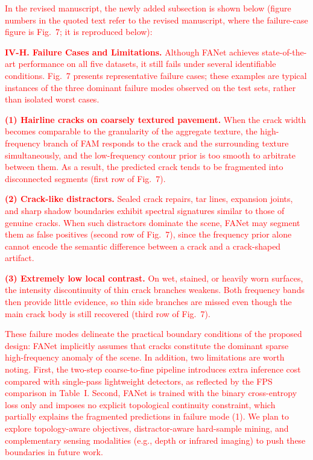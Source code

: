 \documentclass[lettersize,journal,onecolumn,12pt]{IEEEtran}
\begin{document}
\textcolor{red}{In the revised manuscript, the newly added subsection is shown below (figure numbers in the quoted text refer to the revised manuscript, where the failure-case figure is Fig.~7; it is reproduced below):}

\textcolor{red}{
\textbf{IV-H. Failure Cases and Limitations.}
Although FANet achieves state-of-the-art performance on all five datasets, it still fails under several identifiable
conditions. Fig.~7 presents representative failure cases; these examples are typical instances
of the three dominant failure modes observed on the test sets, rather than isolated worst cases.
}

\textcolor{red}{
\textbf{(1) Hairline cracks on coarsely textured pavement.} When the crack width becomes comparable to the
granularity of the aggregate texture, the high-frequency branch of FAM responds to the crack and the surrounding
texture simultaneously, and the low-frequency contour prior is too smooth to arbitrate between them. As a result, the
predicted crack tends to be fragmented into disconnected segments (first row of Fig.~7).
}

\textcolor{red}{
\textbf{(2) Crack-like distractors.} Sealed crack repairs, tar lines, expansion joints, and sharp shadow boundaries
exhibit spectral signatures similar to those of genuine cracks. When such distractors dominate the scene, FANet may
segment them as false positives (second row of Fig.~7), since the frequency prior alone cannot
encode the semantic difference between a crack and a crack-shaped artifact.
}

\textcolor{red}{
\textbf{(3) Extremely low local contrast.} On wet, stained, or heavily worn surfaces, the intensity discontinuity of
thin crack branches weakens. Both frequency bands then provide little evidence, so thin side branches are missed even
though the main crack body is still recovered (third row of Fig.~7).
}

\textcolor{red}{
These failure modes delineate the practical boundary conditions of the proposed design: FANet implicitly assumes that
cracks constitute the dominant sparse high-frequency anomaly of the scene. In addition, two limitations are worth
noting. First, the two-step coarse-to-fine pipeline introduces extra inference cost compared with single-pass
lightweight detectors, as reflected by the FPS comparison in Table~I. Second, FANet is trained with the binary
cross-entropy loss only and imposes no explicit topological continuity constraint, which partially explains the
fragmented predictions in failure mode (1). We plan to explore topology-aware objectives, distractor-aware
hard-sample mining, and complementary sensing modalities (e.g., depth or infrared imaging) to push these boundaries
in future work.
}
\end{document}
